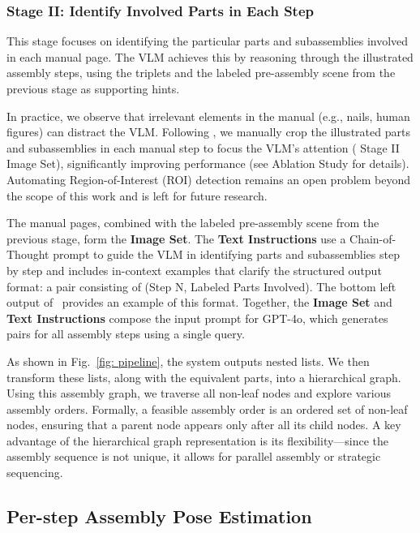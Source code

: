 \subsubsection{Stage II: Identify Involved Parts in Each Step}
This stage focuses on identifying the particular parts and subassemblies involved in each manual page. The VLM achieves this by reasoning through the illustrated assembly steps, using the triplets and the labeled pre-assembly scene from the previous stage as supporting hints.

In practice, we observe that irrelevant elements in the manual (e.g., nails, human figures) can distract the VLM. Following \cite{wang2022ikea}, we manually crop the illustrated parts and subassemblies in each manual step to focus the VLM's attention ( Stage II Image Set), significantly improving performance (see Ablation Study for details). Automating Region-of-Interest (ROI) detection remains an open problem beyond the scope of this work and is left for future research.

The manual pages, combined with the labeled pre-assembly scene from the previous stage, form the \textbf{Image Set}. 
The \textbf{Text Instructions} use a Chain-of-Thought prompt to guide the VLM in identifying parts and subassemblies step by step and includes in-context examples that clarify the structured output format: a pair consisting of (Step N, Labeled Parts Involved). 
The bottom left output of~ provides an example of this format.
Together, the \textbf{Image Set} and \textbf{Text Instructions} compose the input prompt for GPT-4o, which generates pairs for all assembly steps using a single query. 

As shown in Fig.~\ref{fig: pipeline}, the system outputs nested lists. We then transform these lists, along with the equivalent parts, into a hierarchical graph. Using this assembly graph, we traverse all non-leaf nodes and explore various assembly orders. Formally, a feasible assembly order is an ordered set of non-leaf nodes, ensuring that a parent node appears only after all its child nodes. A key advantage of the hierarchical graph representation is its flexibility—since the assembly sequence is not unique, it allows for parallel assembly or strategic sequencing.

\subsection{Per-step Assembly Pose Estimation}
\label{sec:method-per-step}

